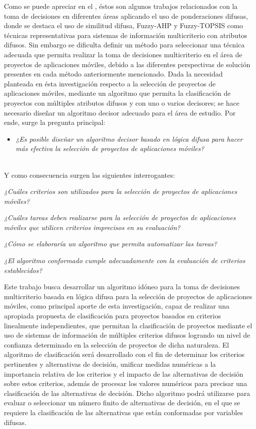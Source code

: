 Como se puede apreciar en el , éstos son algunos trabajos relacionados con la toma de decisiones en diferentes áreas aplicando el uso de ponderaciones difusas, donde se destaca el uso de similitud difusa, Fuzzy-AHP y Fuzzy-TOPSIS como técnicas representativas para sistemas de información multicriterio con atributos difusos. 
Sin embargo se dificulta definir un método para seleccionar una técnica adecuada que permita realizar la toma de decisiones multicriterio en el área de proyectos de aplicaciones móviles, debido a las diferentes perspectivas de solución presentes en cada método anteriormente mencionado. Dada la necesidad planteada en ésta investigación respecto a la selección de proyectos de aplicaciones móviles, mediante un algoritmo que permita la clasificación de proyectos con múltiples atributos difusos y con uno o varios decisores; se hace necesario diseñar un algoritmo decisor adecuado para el  área de estudio. Por ende, surge la pregunta principal:
\begin{itemize}
\item[] \textit{ ¿Es posible diseñar un algoritmo decisor basado en lógica difusa  para hacer más efectiva la selección de proyectos de aplicaciones  móviles?}

\end{itemize}
\\
Y como consecuencia  surgen las siguientes interrogantes:
\begin{viñetas}
\item \textit{¿Cuáles criterios son utilizados para la selección de proyectos de aplicaciones  móviles?}
\item \textit{¿Cuáles tareas deben realizarse para la selección de proyectos de aplicaciones móviles que utilicen criterios imprecisos en su evaluación?}
\item \textit{¿Cómo se elaboraría un algoritmo que permita automatizar las tareas?}
\item \textit{¿El algoritmo conformado cumple adecuadamente con la evaluación de criterios establecidos?}
\\
\end{viñetas}
Este trabajo busca desarrollar un algoritmo idóneo para la toma de decisiones multicriterio basada en lógica difusa para la selección de proyectos de aplicaciones móviles, como principal aporte de esta investigación, capaz de realizar una apropiada propuesta de clasificación para proyectos basados en criterios linealmente independientes, que permitan la clasificación de proyectos mediante el uso de sistemas de información de múltiples criterios difusos logrando un nivel de confianza determinado en la selección de proyectos de dicha naturaleza. El algoritmo de clasificación será desarrollado con el fin de determinar los criterios pertinentes y alternativas de decisión, unificar medidas numéricas a la importancia relativa de los criterios y el impacto de las alternativas de decisión sobre estos criterios, además de procesar los valores numéricos para precisar una clasificación de las alternativas de decisión. Dicho algoritmo podrá utilizarse para evaluar o seleccionar un número finito de alternativas de decisión, en el que se requiere la clasificación de las alternativas que están conformadas por variables difusas.


